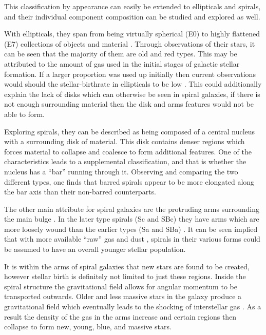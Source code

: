 \documentclass[12pt, twocolumn]{revtex4}    %
\begin{document}
This classification by appearance can easily be extended to ellipticals and spirals, and their individual component composition can be studied and explored as well. 

With ellipticals, they span from being virtually spherical (E0) to highly flattened (E7) collections of objects and material \citep{moore_databook}. Through observations of their stars, it can be seen that the majority of them are old and red types. This may be attributed to the amount of gas used in the initial stages of galactic stellar formation. If a larger proportion was used up initially then current observations would should the stellar-birthrate in ellipticals to be low \citep{carroll_astro}. This could additionally explain the lack of disks which can otherwise be seen in spiral galaxies, if there is not enough surrounding material then the disk and arms features would not be able to form.

Exploring spirals, they can be described as being composed of a central nucleus with a surrounding disk of material. This disk contains denser regions which forces material to collapse and coalesce to form additional features. One of the characteristics leads to a supplemental classification, and that is whether the nucleus has a ``bar'' running through it. Observing and comparing the two different types, one finds that barred spirals appear to be more elongated along the bar axis than their non-barred counterparts. 

The other main attribute for spiral galaxies are the protruding arms surrounding the main bulge \citep{carroll_astro}. In the later type spirals (Sc and SBc) they have arms which are more loosely wound than the earlier types (Sa and SBa) \citep{moore_databook}. It can be seen implied that with more available ``raw'' gas and dust \citep{carroll_astro}, spirals in their various forms could be assumed to have an overall younger stellar population.

It is within the arms of spiral galaxies that new stars are found to be created, however stellar birth is definitely not limited to just these regions. Inside the spiral structure the gravitational field allows for angular momentum to be transported outwards. Older and less massive stars in the galaxy produce a gravitational field which eventually leads to the shocking of interstellar gas \citep{binney_galaxies}. As a result the density of the gas in the arms increase and certain regions then collapse to form new, young, blue, and massive stars. 
\end{document}
